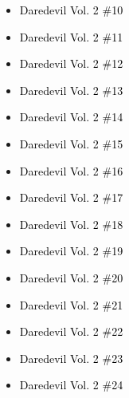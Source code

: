 \documentclass[12pt]{article}
\newcommand{\checkbox}{\raisebox{0.0ex}{\fbox{\rule{0ex}{1.5ex} \rule{1.5ex}{0ex}}}}
\begin{document}
\vspace{0.3cm}
\noindent
\begin{tcolorbox}[
  colback=white!95!gray,
  colframe=black,
  width=\textwidth,
  arc=4mm,
  auto outer arc,
  boxrule=0.8pt,
  left=8pt,right=8pt,top=8pt,bottom=8pt
]
\begin{itemize}[left=0pt,label={\checkbox}]
    \item \textcolor{black}{Daredevil Vol. 2 \#10}
    \item \textcolor{black}{Daredevil Vol. 2 \#11}
    \item \textcolor{black}{Daredevil Vol. 2 \#12}
    \item \textcolor{black}{Daredevil Vol. 2 \#13}
    \item \textcolor{black}{Daredevil Vol. 2 \#14}
    \item \textcolor{black}{Daredevil Vol. 2 \#15}
    \item \textcolor{black}{Daredevil Vol. 2 \#16}
    \item \textcolor{black}{Daredevil Vol. 2 \#17}
    \item \textcolor{black}{Daredevil Vol. 2 \#18}
    \item \textcolor{black}{Daredevil Vol. 2 \#19}
    \item \textcolor{black}{Daredevil Vol. 2 \#20}
    \item \textcolor{black}{Daredevil Vol. 2 \#21}
    \item \textcolor{black}{Daredevil Vol. 2 \#22}
    \item \textcolor{black}{Daredevil Vol. 2 \#23}
    \item \textcolor{black}{Daredevil Vol. 2 \#24}
\end{itemize}
\end{tcolorbox}

\newpage
{}
\end{document}

